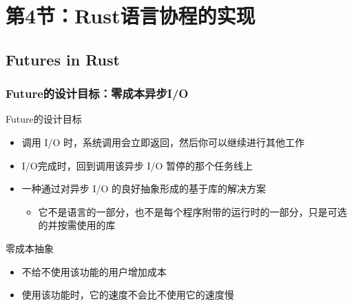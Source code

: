 \section{第4节：Rust语言协程的实现} %
\subsection{Futures in Rust}
% 
% 
\begin{frame}[fragile]
    \frametitle{Future的设计目标：零成本异步I/O}
% 
% 
% 
Future的设计目标

    \begin{itemize}
        \item 调用 I/O 时，系统调用会立即返回，然后你可以继续进行其他工作
        \item I/O完成时，回到调用该异步 I/O 暂停的那个任务线上
        \item {\color{red}一种通过对异步 I/O 的良好抽象形成的基于库的解决方案}
    	\begin{itemize}
    	    \item 它不是语言的一部分，也不是每个程序附带的运行时的一部分，只是可选的并按需使用的库
    	\end{itemize}
    \end{itemize} \pause

{\color{red}零成本抽象}
% 
    \begin{itemize}
        \item 不给不使用该功能的用户增加成本
        \item 使用该功能时，它的速度不会比不使用它的速度慢
    \end{itemize}
% 
\end{frame}
